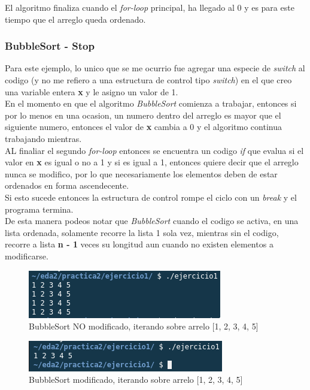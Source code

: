 \documentclass{article}
\begin{document}
				El algoritmo finaliza cuando el \emph{for-loop} principal, ha llegado al 0 y es para este tiempo que el arreglo queda ordenado.
				
				
				\subsubsection{BubbleSort - Stop}
				
				Para este ejemplo, lo unico que se me ocurrio fue agregar una especie de \emph{switch} al codigo (y no me refiero a una estructura de control tipo \emph{switch}) en el que creo una variable entera \textbf{x} y le asigno un valor de 1.\\
				
				En el momento en que el algoritmo \emph{BubbleSort} comienza a trabajar, entonces si por lo menos en una ocasion, un numero dentro del arreglo es mayor que el siguiente numero, entonces el valor de \textbf{x} cambia a 0 y el algoritmo continua trabajando mientras.\\
				
				AL finaliar el segundo \emph{for-loop} entonces se encuentra un codigo \emph{if} que evalua si el valor en \textbf{x} es igual o no a 1 y si es igual a 1, entonces quiere decir que el arreglo nunca se modifico, por lo que necesariamente los elementos deben de estar ordenados en forma ascendecente.\\
				
				Si esto sucede entonces la estructura de control rompe el ciclo con un \emph{break} y el programa termina.\\
				
				De esta manera podeos notar que \emph{BubbleSort} cuando el codigo se activa, en una lista ordenada, solamente recorre la lista 1 sola vez, mientras sin el codigo, recorre a lista \textbf{n - 1} veces su longitud aun cuando no existen elementos a modificarse.
				
				\begin{figure}[H]
					\centering
					\includegraphics{images/bubblestop1.png}
					\caption{BubbleSort NO modificado, iterando sobre arrelo [1, 2, 3, 4, 5]}
				\end{figure} 
			
				\begin{figure}[H]
					\centering
					\includegraphics{images/bubblestop2.png}
					\caption{BubbleSort modificado, iterando sobre arrelo [1, 2, 3, 4, 5]}
				\end{figure} 
			
\end{document}
